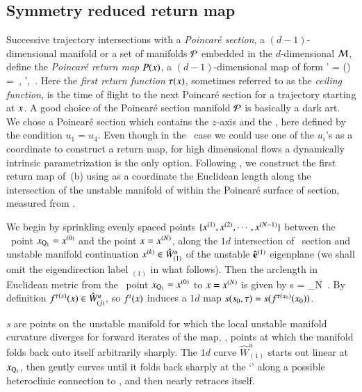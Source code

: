 \documentclass[final,number,sort&compress]{elsarticle}
\begin{document}
\subsection{\label{s:Poincare}Symmetry reduced return map}

Successive trajectory intersections with a {\em Poincar\'e
section}, a $(d-1)$-dim\-ens\-ion\-al manifold or a set of
manifolds $\cal P$ embedded in the $d$-dim\-ens\-ion\-al
{\statesp} ${\cal M}$, define the {\em Poincar\'e return map}
$P({x})$, a $(d-1)$-dim\-ens\-ion\-al map of form
\beq
\ssp' = \PoincM({\ssp})
          =  \flow{\tau(\ssp)}{\ssp}
\,,\qquad
\ssp', \ssp \in \PoincS
\,.
Here the {\em first return function} $\tau(x)$, sometimes
referred to as the {\em ceiling function}, is the time of
flight to the next {Poincar\'e} section for a trajectory starting at
$x$. A good choice of the {Poincar\'e} section manifold $\cal P$
is basically a dark art. We chose a Poincar\'e section which contains the $z$-axis and
the \reqv, here defined by the condition $u_1=u_4$.
Even though in the \cLe\ case we could use one of the $u_i$'s
as a coordinate to construct a return map, for high dimensional
flows a dynamically intrinsic parametrization is the only option.
Following , we construct the first
return map of \,(b) using as a coordinate
the Euclidean length along the intersection of the unstable
manifold of  within the Poincar\'e surface of
section, measured from .


We begin by sprinkling evenly spaced points
$\{x^{(1)},x^{(2)},\cdots,x^{(N-1)}\}$ between the
\reqv\ point $x_{\mathrm{Q}_{1}}=x^{(0)}$ and the point
$x= x^{(N)}$, along the $1d$ intersection of \Poincare\
section and unstable manifold continuation $x^{(k)} \in
\hat{W}^u_{(1)}$ of the unstable ${\bf \hat{e}}^{(1)}$
eigen\-plane (we shall omit the eigen\-direction label
${}_{(1)}$ in what follows). Then the arclength in Euclidean
metric from the
\reqv\ point $x_{\mathrm{Q}_{1}}=x^{(0)}$ to $x=
x^{(N)}$ is given by
\beq
s = \lim_{N\to\infty}
\,.
By definition $f^{\tau(x)}(x) \in \hat{W}^u_{(j)}$, so
$f^t(x)$ induces a $1d$ map $s(s_0,\tau) =
s(f^{\tau({x_0})}({x_0}))$.

{\em \Turn s} are points on the unstable manifold for which
the local unstable manifold curvature diverges for forward
iterates of the map, \ie, points at which the manifold folds
back onto itself arbitrarily sharply. The $1d$ curve $\hat{W}^u_{(1)}$
starts out linear at $x_{\mathrm{Q}_{1}}$, then gently curves
until it folds back sharply at the `\turn' along a possible
heteroclinic connection to , and then nearly retraces
itself.
\end{document}
